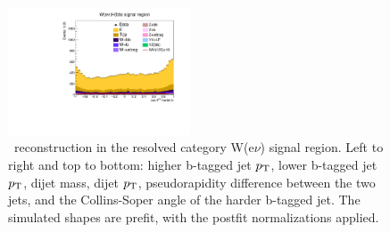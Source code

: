 \begin{figure}[tbp]
\begin{center}
    \includegraphics[width=0.48\textwidth]{figures/wlnhbb2016/resolved/WenWHSR_hbbCosThetaCSJ1.pdf}
    \caption{\HBB\ reconstruction in the resolved category W(e$\nu$) signal region.
    Left to right and top to bottom: higher b-tagged jet $p_{\mathrm{T}}$, lower b-tagged jet $p_{\mathrm{T}}$, dijet mass, dijet $p_{\mathrm{T}}$, 
    pseudorapidity difference between the two jets, and the Collins-Soper angle of the harder b-tagged jet.
    The simulated shapes are prefit, with the postfit normalizations applied.}
    \label{fig:res_WenSR_Hbb}
  \end{center}
\end{figure}
\clearpage

